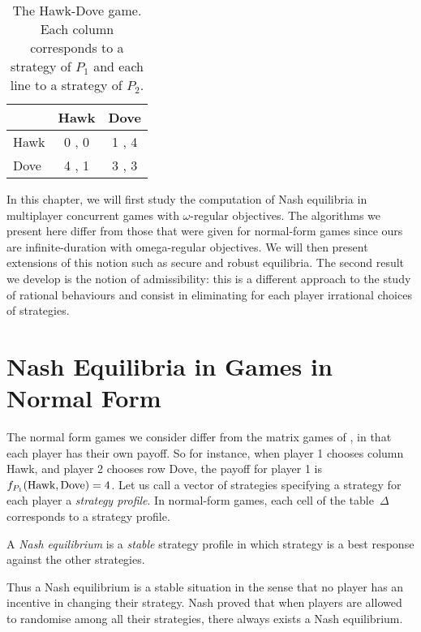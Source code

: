 \begin{table}
  \caption{The Hawk-Dove game. Each column corresponds to a strategy of
    \(P_1\) and each line to a strategy of \(P_2\).}
  \label{14-tab:hawk-dove}
  \begin{center}
    \begin{tabular}[c]{|@{~}l@{~}|@{~}c@{~} @{~}c@{~}|}
      \hline
      & Hawk & Dove \\
      \hline
      Hawk & 0 , 0 & 1 , 4 \\
      Dove & 4 , 1 & 3 , 3 \\
      \hline
    \end{tabular}
  \end{center}
\end{table}

\medskip
In this chapter, we will first study the computation of Nash
equilibria in multiplayer concurrent games with $\omega$-regular
objectives. The algorithms we present here differ from those that were
given for normal-form games since ours are infinite-duration with
omega-regular objectives. We will then present extensions of this notion
such as secure and
robust equilibria. The second result we develop is
the notion of admissibility: this is a different approach to the study
of rational behaviours and consist in eliminating for each player
irrational choices of strategies.

\section{Nash Equilibria in Games in Normal
Form}\label{14-section:nash-equilibria-in-games-in-normal-form}

% 
The normal form games we consider differ from the matrix games of , in that each player has their own payoff.
So for instance, when player 1 chooses column Hawk, and player 2 chooses
row Dove, the payoff for player 1 is $f_{P_1}(\text{Hawk}, \text{Dove}) = 4$.
Let us call a vector of strategies specifying a strategy for each player a \emph{strategy profile}. In normal-form games, each cell of the table~$\Delta$ corresponds to a strategy profile.

\begin{definition}
  A \emph{Nash equilibrium} is a \emph{stable} strategy profile in which
  strategy is a best response against the other strategies.
\end{definition}
Thus a Nash equilibrium is a stable situation in the sense that
no player has an incentive in changing their strategy.
Nash proved that when
players are allowed to randomise among all their strategies, there always
exists a Nash equilibrium.

